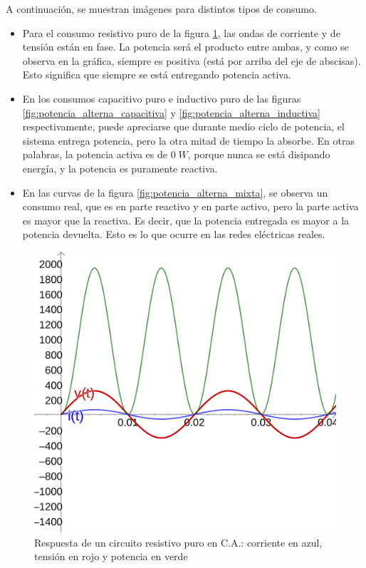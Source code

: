 A continuación, se muestran imágenes para distintos tipos de consumo.
\begin{itemize}
	\item Para el consumo resistivo puro de la figura \ref{fig:potencia_alterna_resistiva}, las ondas de corriente y de tensión están en fase. La potencia será el producto entre ambas, y como se observa en la gráfica, siempre es positiva (está por arriba del eje de abscisas). Esto significa que siempre se está entregando potencia activa.
	\item En los consumos capacitivo puro e inductivo puro de las figuras \ref{fig:potencia_alterna_capacitiva} y \ref{fig:potencia_alterna_inductiva} respectivamente, puede apreciarse que durante medio ciclo de potencia, el sistema entrega potencia, pero la otra mitad de tiempo la absorbe. En otras palabras, la potencia activa es de $0\; W$, porque nunca se está disipando energía, y la potencia es puramente reactiva.
	\item En las curvas de la figura \ref{fig:potencia_alterna_mixta}, se observa un consumo real, que es en parte reactivo y en parte activo, pero la parte activa es mayor que la reactiva. Es decir, que la potencia entregada es mayor a la potencia devuelta. Esto es lo que ocurre en las redes eléctricas reales.
\end{itemize}
\begin{figure}[htbp]
  \includegraphics[scale=0.1]{images/potencia_alterna_resistiva}
  \caption{Respuesta de un circuito resistivo puro en C.A.: corriente en azul, tensión en rojo y potencia en verde}
  \label{fig:potencia_alterna_resistiva}
\end{figure}

